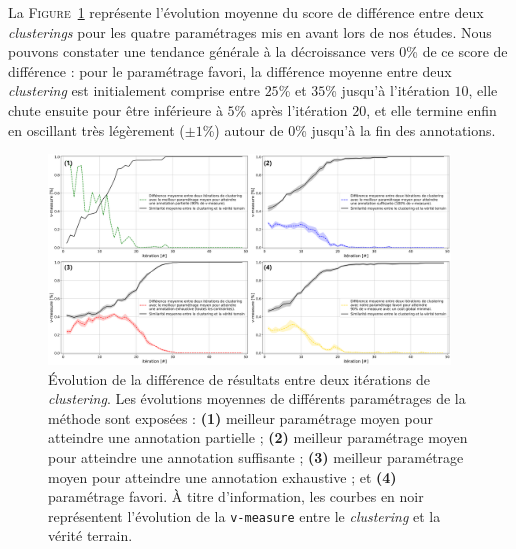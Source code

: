 			La \textsc{Figure~\ref{figure:4.5.2-ETUDE-RENTABILITE-SIMILARITE-CLUSTERING}} représente l'évolution moyenne du score de différence entre deux \textit{clusterings} pour les quatre paramétrages mis en avant lors de nos études.
			Nous pouvons constater une tendance générale à la décroissance vers $0$\% de ce score de différence : pour le paramétrage favori, la différence moyenne entre deux \textit{clustering} est initialement comprise entre $25$\% et $35$\% jusqu'à l'itération $10$, elle chute ensuite pour être inférieure à $5$\% après l'itération $20$, et elle termine enfin en oscillant très légèrement ($\pm1$\%) autour de $0$\% jusqu'à la fin des annotations.
			\begin{figure}[!htb]
				\centering
				\includegraphics[width=0.95\textwidth]{figures/etude-rentabilite-similarite-clustering}
				\caption{
					Évolution de la différence de résultats entre deux itérations de \textit{clustering}.
					Les évolutions moyennes de différents paramétrages de la méthode sont exposées :
					\textbf{(1)} meilleur paramétrage moyen pour atteindre une annotation partielle ;
					\textbf{(2)} meilleur paramétrage moyen pour atteindre une annotation suffisante ;
					\textbf{(3)} meilleur paramétrage moyen pour atteindre une annotation exhaustive ;
					et \textbf{(4)} paramétrage favori.
					À titre d'information, les courbes en noir représentent l'évolution de la \texttt{v-measure} entre le \textit{clustering} et la vérité terrain.
				}
				\label{figure:4.5.2-ETUDE-RENTABILITE-SIMILARITE-CLUSTERING}
			\end{figure}
			
